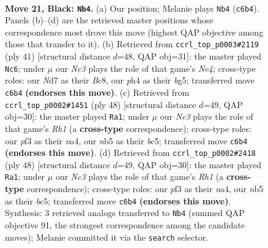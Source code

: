 \documentclass[11pt]{article}
\begin{document}
\clearpage

\begin{figure}[p]\centering
\begin{subfigure}{0.46\textwidth}\centering
\resizebox{\linewidth}{!}{%
\newchessgame
\chessboard[
  setfen={2k3r1/1ppnp2p/2n3p1/pN6/5B1P/5P2/P1P1KP2/R7 b - - 0 21},
  showmover=false,
  pgfstyle=straightmove, color=movearrow, markmove={c6-b4}
]}
\caption{}
\end{subfigure}\hfill
\begin{subfigure}{0.46\textwidth}\centering
\resizebox{\linewidth}{!}{%
\newchessgame
\chessboard[
  setfen={2b1k2r/5ppp/p3p3/4n1B1/Pp1R4/1B6/1P3PPP/6K1 b k - 0 21},
  showmover=false,
  pgfstyle=straightmove, color=movearrow, markmove={e5-c6}
]}
\caption{}
\end{subfigure}
\\[4pt]
\begin{subfigure}{0.46\textwidth}\centering
\resizebox{\linewidth}{!}{%
\newchessgame
\chessboard[
  setfen={1k5r/pp3p1p/2p5/P1b2N2/n4P2/4P3/4KPBP/7R w - - 1 25},
  showmover=false,
  pgfstyle=straightmove, color=movearrow, markmove={h1-a1}
]}
\caption{}
\end{subfigure}\hfill
\begin{subfigure}{0.46\textwidth}\centering
\resizebox{\linewidth}{!}{%
\newchessgame
\chessboard[
  setfen={1k5r/pp3p1p/2p5/P1b2N2/n4P2/4P3/4KPBP/7R w - - 0 25},
  showmover=false,
  pgfstyle=straightmove, color=movearrow, markmove={h1-a1}
]}
\caption{}
\end{subfigure}
\caption{\textbf{Move 21, Black: \texttt{Nb4}.} (a) Our position; Melanie plays \texttt{Nb4} (\texttt{c6b4}). Panels (b)--(d) are the retrieved master positions whose correspondence most drove this move (highest QAP objective among those that transfer to it). (b) Retrieved from \texttt{ccrl\_top\_p0003\#2119} (ply 41) [structural distance $d$=48, QAP obj=31]: the master played \texttt{Nc6}; under $\mu$ our \emph{Nc3} plays the role of that game's \emph{Ne4}; cross-type roles: our \emph{N}d7 as their \emph{B}c8, our \emph{p}h4 as their \emph{b}g5; transferred move \texttt{c6b4} \textbf{(endorses this move)}. (c) Retrieved from \texttt{ccrl\_top\_p0002\#1451} (ply 48) [structural distance $d$=49, QAP obj=30]: the master played \texttt{Ra1}; under $\mu$ our \emph{Nc3} plays the role of that game's \emph{Rh1} (a \textbf{cross-type} correspondence); cross-type roles: our \emph{p}f3 as their \emph{n}a4, our \emph{n}b5 as their \emph{b}c5; transferred move \texttt{c6b4} \textbf{(endorses this move)}. (d) Retrieved from \texttt{ccrl\_top\_p0002\#2418} (ply 48) [structural distance $d$=49, QAP obj=30]: the master played \texttt{Ra1}; under $\mu$ our \emph{Nc3} plays the role of that game's \emph{Rh1} (a \textbf{cross-type} correspondence); cross-type roles: our \emph{p}f3 as their \emph{n}a4, our \emph{n}b5 as their \emph{b}c5; transferred move \texttt{c6b4} \textbf{(endorses this move)}. Synthesis: 3 retrieved analogs transferred to \texttt{Nb4} (summed QAP objective 91, the strongest correspondence among the candidate moves); Melanie committed it via the \texttt{search} selector.}
\label{fig:thought-m41}
\end{figure}
\end{document}
